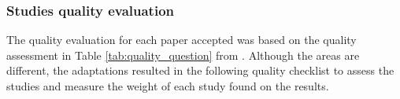 




\subsubsection{Studies quality evaluation}
\label{subsubsec:conducting-quality}

The quality evaluation for each paper accepted was based on the quality assessment in Table \ref{tab:quality_question} from . Although the areas are different, the adaptations resulted in the following quality checklist to assess the studies and measure the weight of each study found on the results.

